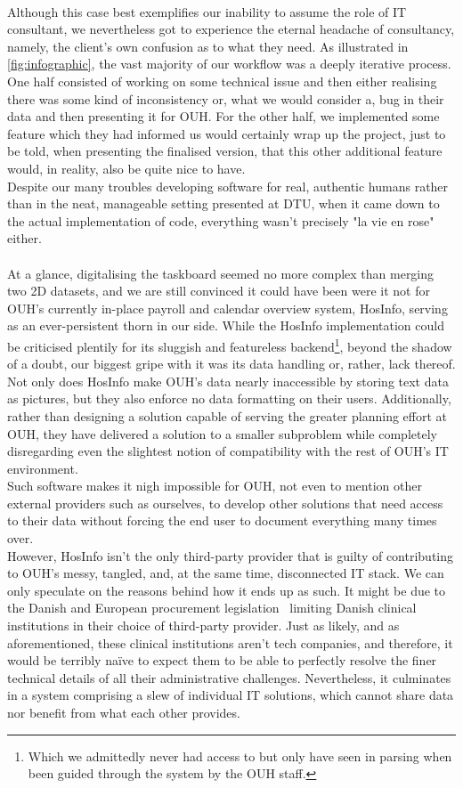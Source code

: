 \\
Although this case best exemplifies our inability to assume the role of IT consultant, we nevertheless got to experience the eternal headache of consultancy, namely, the client's own confusion as to what they need. As illustrated in \autoref{fig:infographic}, the vast majority of our workflow was a deeply iterative process. One half consisted of working on some technical issue and then either realising there was some kind of inconsistency or, what we would consider a, bug in their data and then presenting it for OUH. For the other half, we implemented some feature which they had informed us would certainly wrap up the project, just to be told, when presenting the finalised version, that this other additional feature would, in reality, also be quite nice to have.
\\
Despite our many troubles developing software for real, authentic humans rather than in the neat, manageable setting presented at DTU, when it came down to the actual implementation of code, everything wasn't precisely "la vie en rose" either.
\\
\\
At a glance, digitalising the taskboard seemed no more complex than merging two 2D datasets, and we are still convinced it could have been were it not for OUH's currently in-place payroll and calendar overview system, HosInfo, serving as an ever-persistent thorn in our side. While the HosInfo implementation could be criticised plentily for its sluggish and featureless backend\footnote{Which we admittedly never had access to but only have seen in parsing when been guided through the system by the OUH staff.}, beyond the shadow of a doubt, our biggest gripe with it was its data handling or, rather, lack thereof. Not only does HosInfo make OUH's data nearly inaccessible by storing text data as pictures, but they also enforce no data formatting on their users. Additionally, rather than designing a solution capable of serving the greater planning effort at OUH, they have delivered a solution to a smaller subproblem while completely disregarding even the slightest notion of compatibility with the rest of OUH's IT environment.
\\
Such software makes it nigh impossible for OUH, not even to mention other external providers such as ourselves, to develop other solutions that need access to their data without forcing the end user to document everything many times over.
\\ 
However, HosInfo isn't the only third-party provider that is guilty of contributing to OUH's messy, tangled, and, at the same time, disconnected IT stack. We can only speculate on the reasons behind how it ends up as such. It might be due to the Danish and European procurement legislation~\cite{Udbudsloven, EU-Procurement-Legislation} limiting Danish clinical institutions in their choice of third-party provider. Just as likely, and as aforementioned, these clinical institutions aren't tech companies, and therefore, it would be terribly na\"ive to expect them to be able to perfectly resolve the finer technical details of all their administrative challenges. Nevertheless, it culminates in a system comprising a slew of individual IT solutions, which cannot share data nor benefit from what each other provides.
